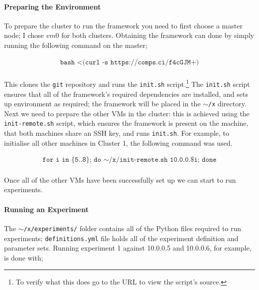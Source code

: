 \documentclass[a4paper,10pt]{article}
\begin{document}
\paragraph{Preparing the Environment} To prepare the cluster to run the framework you need to first choose a master node; I chose $vm0$ for both clusters. Obtaining the framework can done by simply running the following command on the master;

\vspace{-4mm}
\begin{align*}
    \texttt{bash <(curl -s https://comps.ci/f4cGJM+)}
\end{align*}

\paragraph{} This clones the \texttt{git} repository and runs the \texttt{init.sh} script.\footnote{To verify what this does go to the URL to view the script's source.} The \texttt{init.sh} script ensures that all of the framework's required dependencies are installed, and sets up environment as required; the framework will be placed in the \texttt{$\sim$/x} directory. Next we need to prepare the other VMs in the cluster: this is achieved using the \texttt{init-remote.sh} script, which ensures the framework is present on the machine, that both machines share an SSH key, and runs \texttt{init.sh}. For example, to initialise all other machines in Cluster 1, the following command was used.

\vspace{-4mm}
\begin{align*}
    \texttt{for i in \{5..8\}; do $\sim$/x/init-remote.sh 10.0.0.\$i; done}
\end{align*}

\paragraph{} Once all of the other VMs have been successfully set up we can start to run experiments.

\paragraph{Running an Experiment} The \texttt{$\sim$/x/experiments/} folder contains all of the Python files required to run experiments; \texttt{definitions.yml} file holds all of the experiment definition and parameter sets. Running experiment 1 against 10.0.0.5 and 10.0.0.6, for example, is done with;
\end{document}
